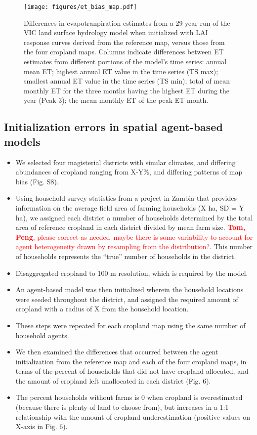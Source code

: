 \documentclass{pnastwo}
\begin{document}
\begin{article}
\vspace{-0.5 cm}
\begin{figure}[ht]
\centerline{\texttt{[image: figures/et\_bias\_map.pdf]}}
\caption{Differences in evapotranpiration estimates from a 29 year run of the VIC land surface hydrology model when initialized with LAI response curves derived from the reference map, versus those from the four cropland maps. Columns indicate differences between ET estimates from different portions of the model's time series: annual mean ET; highest annual ET value in the time series (TS max); smallest annual ET value in the time series (TS min); total of mean monthly ET for the three months having the highest ET during the year (Peak 3); the mean monthly ET of the peak ET month.}\label{afoto}
\end{figure}

\subsection{Initialization errors in spatial agent-based models}

\begin{itemize}
  \item We selected four magisterial districts with similar climates, and differing abundances of cropland ranging from X-Y\%, and differing patterns of map bias (Fig. S8). 
  \item Using household survey statistics from a project in Zambia that provides information on the average field area of farming households (X ha, SD = Y ha), we assigned each district a number of households determined by the total area of reference cropland in each district divided by mean farm size. \textcolor{red}{\textbf{Tom, Peng}, please correct as needed--maybe there is some variability to account for agent heterogeneity drawn by resampling from the distribution?}. This number of households represents the ``true'' number of households in the district.
  \item Disaggregated cropland to 100 m resolution, which is required by the model. 
  \item An agent-based model was then initialized wherein the household locations were seeded throughout the district, and assigned the required amount of cropland with a radius of X from the household location.
  \item These steps were repeated for each cropland map using the same number of household agents. 
  \item We then examined the differences that occurred between the agent initialization from the reference map and each of the four cropland maps, in terms of the percent of households that did not have cropland allocated, and the amount of cropland left unallocated in each district (Fig. 6).  
  \item The percent households without farms is 0 when cropland is overestimated (because there is plenty of land to choose from), but increases in a 1:1 relationship with the amount of cropland underestimation (positive values on X-axis in Fig. 6). \end{itemize} 


\end{article}
\end{document}
